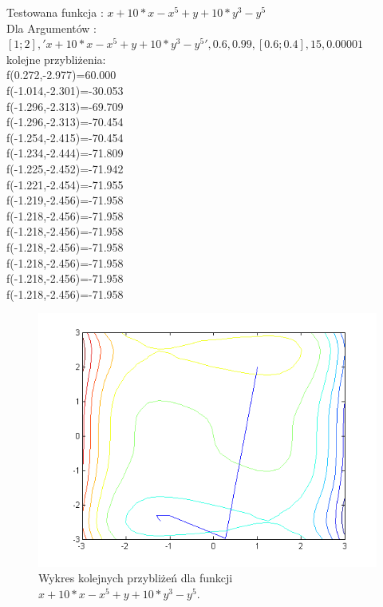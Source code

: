 \documentclass{classrep}
\begin{document}
Testowana funkcja : $x + 10*x - x^5 + y + 10*y^3 - y^5$\\
Dla Argumentów : $[1;2],'x + 10*x - x^5 + y + 10*y^3 - y^5',0.6,0.99,[0.6;0.4],15,0.00001$\\
kolejne przybliżenia:\\
f(0.272,-2.977)=60.000\\
f(-1.014,-2.301)=-30.053\\
f(-1.296,-2.313)=-69.709\\
f(-1.296,-2.313)=-70.454\\
f(-1.254,-2.415)=-70.454\\
f(-1.234,-2.444)=-71.809\\
f(-1.225,-2.452)=-71.942\\
f(-1.221,-2.454)=-71.955\\
f(-1.219,-2.456)=-71.958\\
f(-1.218,-2.456)=-71.958\\
f(-1.218,-2.456)=-71.958\\
f(-1.218,-2.456)=-71.958\\
f(-1.218,-2.456)=-71.958\\
f(-1.218,-2.456)=-71.958\\
f(-1.218,-2.456)=-71.958\\



\begin{figure}[H]
\centering
\includegraphics[width=12cm]{fcja2} 
\caption{Wykres kolejnych przybliżeń dla funkcji  $x + 10*x - x^5 + y + 10*y^3 - y^5$.}
\label{fig:funkcja_2}
\end{figure}
\end{document}
